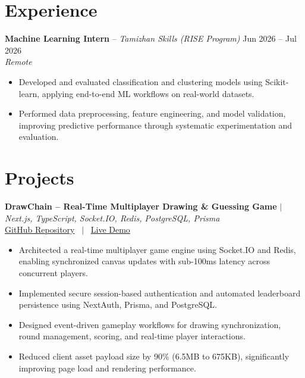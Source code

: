 \documentclass[10pt, a4paper]{article}
\begin{document}

\section{Experience}

\textbf{Machine Learning Intern} -- \textit{Tamizhan Skills (RISE Program)} \hfill Jun 2026 -- Jul 2026 \\
\textit{\small{Remote}} \\
\begin{itemize}

    \item Developed and evaluated classification and clustering models using Scikit-learn, applying end-to-end ML workflows on real-world datasets.

    \item Performed data preprocessing, feature engineering, and model validation, improving predictive performance through systematic experimentation and evaluation.

\end{itemize}
\vspace{2pt}



\section{Projects}

\textbf{DrawChain -- Real-Time Multiplayer Drawing \& Guessing Game} $|$ \textit{Next.js, TypeScript, Socket.IO, Redis, PostgreSQL, Prisma} \\

\small{
\href{https://github.com/PankajKumar-11/DrawChain}{GitHub Repository}
 \ $|$ \ \href{https://demo.example.com}{Live Demo}
} \\

\begin{itemize}

    \item Architected a real-time multiplayer game engine using Socket.IO and Redis, enabling synchronized canvas updates with sub-100ms latency across concurrent players.

    \item Implemented secure session-based authentication and automated leaderboard persistence using NextAuth, Prisma, and PostgreSQL.

    \item Designed event-driven gameplay workflows for drawing synchronization, round management, scoring, and real-time player interactions.

    \item Reduced client asset payload size by 90\% (6.5MB to 675KB), significantly improving page load and rendering performance.

\end{itemize}
\vspace{2pt}
\end{document}
